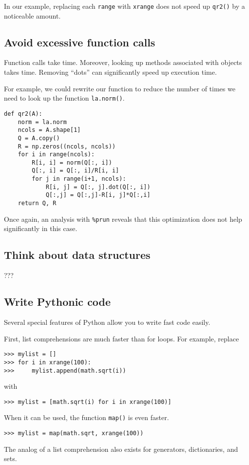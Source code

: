 In our example, replacing each \texttt{range} with \texttt{xrange} does not speed up \texttt{qr2()} by a noticeable amount.

\subsection*{Avoid excessive function calls}
Function calls take time.
Moreover, looking up methods associated with objects takes time.
Removing ``dots'' can significantly speed up execution time.

For example, we could rewrite our function to reduce the number of times we need to look up the function \texttt{la.norm()}.

\begin{lstlisting}
def qr2(A):
    norm = la.norm
    ncols = A.shape[1]
    Q = A.copy()
    R = np.zeros((ncols, ncols))
    for i in range(ncols):
        R[i, i] = norm(Q[:, i])
        Q[:, i] = Q[:, i]/R[i, i]
        for j in range(i+1, ncols):
            R[i, j] = Q[:, j].dot(Q[:, i])
            Q[:,j] = Q[:,j]-R[i, j]*Q[:,i]
    return Q, R
\end{lstlisting}

Once again, an analysis with \texttt{\%prun} reveals that this optimization does not help significantly in this case.

\subsection*{Think about data structures}
???

\subsection*{Write Pythonic code}
Several special features of Python allow you to write fast code easily.

First, list comprehensions are much faster than for loops.
For example, replace
\begin{lstlisting}
>>> mylist = []
>>> for i in xrange(100):
>>>     mylist.append(math.sqrt(i))
\end{lstlisting}
with 
\begin{lstlisting}
>>> mylist = [math.sqrt(i) for i in xrange(100)]
\end{lstlisting}
When it can be used, the function \texttt{map()} is even faster.
\begin{lstlisting}
>>> mylist = map(math.sqrt, xrange(100))
\end{lstlisting}
The analog of a list comprehension also exists for generators, dictionaries, and sets.

